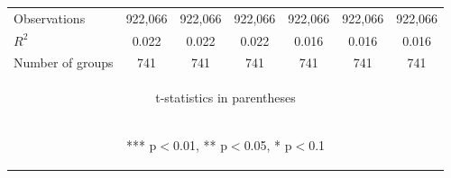 \documentclass[]{article}
\begin{document}
\begin{center}
\begin{tabular}{lcccccc}
        Observations     & 922,066                                        & 922,066                                        & 922,066                                        & 922,066                                        & 922,066                                        & 922,066                                        \\
        $R^2$            & 0.022                                          & 0.022                                          & 0.022                                          & 0.016                                          & 0.016                                          & 0.016                                          \\
        Number of groups & 741                                            & 741                                            & 741                                            & 741                                            & 741                                            & 741                                            \\ \hline
        \multicolumn{7}{c}{\begin{footnotesize} t-statistics in parentheses\end{footnotesize}}                                                                                                                                                                                                                                 \\
        \multicolumn{7}{c}{\begin{footnotesize} *** p$<$0.01, ** p$<$0.05, * p$<$0.1\end{footnotesize}}                                                                                                                                                                                                                        \\
    \end{tabular}
\end{center}
\end{document}
